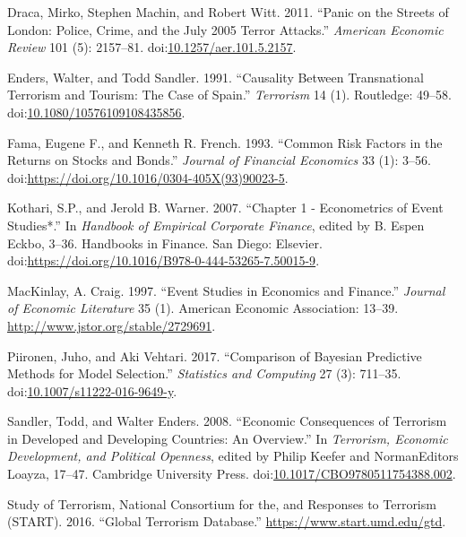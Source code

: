 \documentclass[]{AEA}
\begin{document}
\hypertarget{ref-10.1257ux2faer.101.5.2157}{}
Draca, Mirko, Stephen Machin, and Robert Witt. 2011. ``Panic on the
Streets of London: Police, Crime, and the July 2005 Terror Attacks.''
\emph{American Economic Review} 101 (5): 2157--81.
doi:\href{https://doi.org/10.1257/aer.101.5.2157}{10.1257/aer.101.5.2157}.

\hypertarget{ref-doi:10.1080ux2f10576109108435856}{}
Enders, Walter, and Todd Sandler. 1991. ``Causality Between
Transnational Terrorism and Tourism: The Case of Spain.''
\emph{Terrorism} 14 (1). Routledge: 49--58.
doi:\href{https://doi.org/10.1080/10576109108435856}{10.1080/10576109108435856}.

\hypertarget{ref-FAMA19933}{}
Fama, Eugene F., and Kenneth R. French. 1993. ``Common Risk Factors in
the Returns on Stocks and Bonds.'' \emph{Journal of Financial Economics}
33 (1): 3--56.
doi:\href{https://doi.org/https://doi.org/10.1016/0304-405X(93)90023-5}{https://doi.org/10.1016/0304-405X(93)90023-5}.

\hypertarget{ref-Kothari20073}{}
Kothari, S.P., and Jerold B. Warner. 2007. ``Chapter 1 - Econometrics of
Event Studies*.'' In \emph{Handbook of Empirical Corporate Finance},
edited by B. Espen Eckbo, 3--36. Handbooks in Finance. San Diego:
Elsevier.
doi:\href{https://doi.org/https://doi.org/10.1016/B978-0-444-53265-7.50015-9}{https://doi.org/10.1016/B978-0-444-53265-7.50015-9}.

\hypertarget{ref-10.2307ux2f2729691}{}
MacKinlay, A. Craig. 1997. ``Event Studies in Economics and Finance.''
\emph{Journal of Economic Literature} 35 (1). American Economic
Association: 13--39. \url{http://www.jstor.org/stable/2729691}.

\hypertarget{ref-Piironen2017}{}
Piironen, Juho, and Aki Vehtari. 2017. ``Comparison of Bayesian
Predictive Methods for Model Selection.'' \emph{Statistics and
Computing} 27 (3): 711--35.
doi:\href{https://doi.org/10.1007/s11222-016-9649-y}{10.1007/s11222-016-9649-y}.

\hypertarget{ref-sandler_enders_2008}{}
Sandler, Todd, and Walter Enders. 2008. ``Economic Consequences of
Terrorism in Developed and Developing Countries: An Overview.'' In
\emph{Terrorism, Economic Development, and Political Openness}, edited
by Philip Keefer and NormanEditors Loayza, 17--47. Cambridge University
Press.
doi:\href{https://doi.org/10.1017/CBO9780511754388.002}{10.1017/CBO9780511754388.002}.

\hypertarget{ref-GTD}{}
Study of Terrorism, National Consortium for the, and Responses to
Terrorism (START). 2016. ``Global Terrorism Database.''
\url{https://www.start.umd.edu/gtd}.
\end{document}
